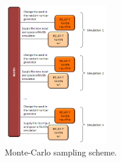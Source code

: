 \documentclass{mc2013}
\begin{document}
\begin{figure}
\centering
\includegraphics[width=0.4\textwidth]{figures/sampling_mc.PNG}
\caption{Monte-Carlo sampling scheme.}
\label{fig:MCsampling}
\end{figure}
\end{document}

